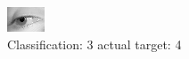 \begin{figure}[h!]
\begin{center}
\includegraphics[width=0.60\columnwidth]{figures/ID2984_class_3_target_4.png}
\end{center}
\caption{ Classification: 3 actual target: 4}
\label{fig:ID2984_class_3_target_4}
\end{figure}
